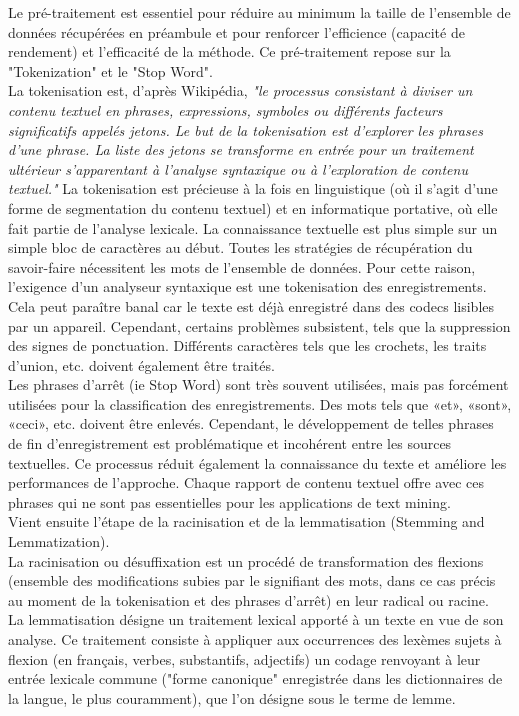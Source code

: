 \documentclass[12pt]{report}
\begin{document}
Le pré-traitement est essentiel pour réduire au minimum la taille de l'ensemble de données récupérées en préambule et pour renforcer l'efficience (capacité de rendement) et l'efficacité de la méthode. Ce pré-traitement repose sur la "Tokenization" et le "Stop Word".\\

La tokenisation est, d'après Wikipédia, \textit {"le processus consistant à diviser un contenu textuel en phrases, expressions, symboles ou différents facteurs significatifs appelés jetons. Le but de la tokenisation est d'explorer les phrases d'une phrase. La liste des jetons se transforme en entrée pour un traitement ultérieur s'apparentant à l'analyse syntaxique ou à l'exploration de contenu textuel."} La tokenisation est précieuse à la fois en linguistique (où il s’agit d’une forme de segmentation du contenu textuel) et en informatique portative, où elle fait partie de l’analyse lexicale. La connaissance textuelle est plus simple sur un simple bloc de caractères au début. Toutes les stratégies de récupération du savoir-faire nécessitent les mots de l'ensemble de données. Pour cette raison, l'exigence d'un analyseur syntaxique est une tokenisation des enregistrements. Cela peut paraître banal car le texte est déjà enregistré dans des codecs lisibles par un appareil. Cependant, certains problèmes subsistent, tels que la suppression des signes de ponctuation. Différents caractères tels que les crochets, les traits d'union, etc. doivent également être traités.\\
Les phrases d’arrêt (ie Stop Word) sont très souvent utilisées, mais pas forcément utilisées pour la classification des enregistrements. Des mots tels que «et», «sont», «ceci», etc. doivent être enlevés. Cependant, le développement de telles phrases de fin d'enregistrement est problématique et incohérent entre les sources textuelles. Ce processus réduit également la connaissance du texte et améliore les performances de l'approche. Chaque rapport de contenu textuel offre avec ces phrases qui ne sont pas essentielles pour les applications de text mining.\\

Vient ensuite l'étape de la racinisation et de la lemmatisation (Stemming and Lemmatization). \\
La racinisation ou désuffixation est un procédé de transformation des flexions (ensemble des modifications subies par le signifiant des mots, dans ce cas précis au moment de la tokenisation et des phrases d'arrêt) en leur radical ou racine. \\
La lemmatisation désigne un traitement lexical apporté à un texte en vue de son analyse. Ce traitement consiste à appliquer aux occurrences des lexèmes sujets à flexion (en français, verbes, substantifs, adjectifs) un codage renvoyant à leur entrée lexicale commune ("forme canonique" enregistrée dans les dictionnaires de la langue, le plus couramment), que l'on désigne sous le terme de lemme. \\
\end{document}
